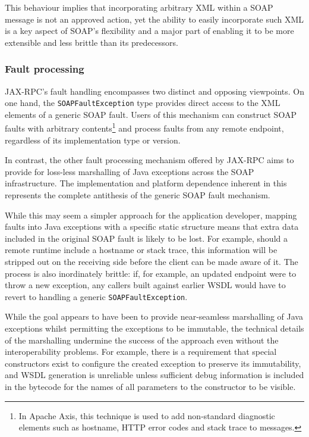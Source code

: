This behaviour implies that incorporating arbitrary XML within a SOAP
message is not an approved action, yet the ability to easily
incorporate such XML is a key aspect of SOAP's flexibility and a major
part of enabling it to be more extensible and less brittle than its
predecessors.

\subsubsection{Fault processing}
\label{objections:soap-not-rmi:faults}

JAX-RPC's fault handling encompasses two distinct and opposing
viewpoints. On one hand, the {\tt SOAPFaultException} type provides
direct access to the XML elements of a generic SOAP fault. Users of
this mechanism can construct SOAP faults with arbitrary
contents\footnote{In Apache Axis, this technique is used to add
non-standard diagnostic elements such as hostname, HTTP error codes
and stack trace to messages.} and process faults from any remote
endpoint, regardless of its implementation type or version.

In contrast, the other fault processing mechanism offered by JAX-RPC
aims to provide for loss-less marshalling of Java exceptions across
the SOAP infrastructure. The implementation and platform dependence
inherent in this represents the complete antithesis of the generic
SOAP fault mechanism.

While this may seem a simpler approach for the application developer,
mapping faults into Java exceptions with a specific static structure
means that extra data included in the original SOAP fault is likely to
be lost. For example, should a remote runtime include a hostname or
stack trace, this information will be stripped out on the receiving
side before the client can be made aware of it. The process is also
inordinately brittle: if, for example, an updated endpoint were to
throw a new exception, any callers built against earlier WSDL would
have to revert to handling a generic {\tt SOAPFaultException}.

While the goal appears to have been to provide near-seamless
marshalling of Java exceptions whilst permitting the exceptions to be
immutable, the technical details of the marshalling undermine the
success of the approach even without the interoperability problems.
For example, there is a requirement that special constructors exist to
configure the created exception to preserve its immutability, and WSDL
generation is unreliable unless sufficient debug information is
included in the bytecode for the names of all parameters to the
constructor to be visible.

